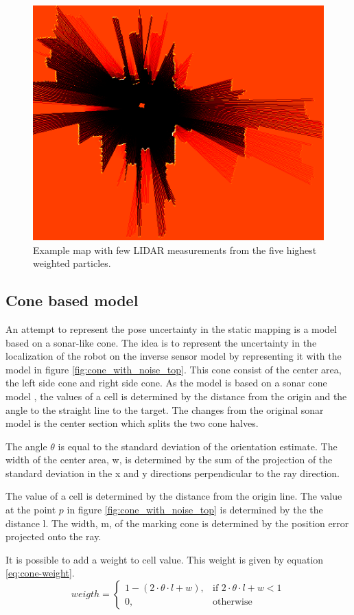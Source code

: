 \begin{figure}[htbp]
	\centering
	\includegraphics[width=0.7\linewidth]{figures/static_mapping/particle_sensor}
	\caption{Example map with few LIDAR measurements from the five highest weighted particles.}
	\label{fig:particle_sensor}
\end{figure}

\subsection{Cone based model}
An attempt to represent the pose uncertainty in the static mapping is a model based on a sonar-like cone. 
The idea is to represent the uncertainty in the localization of the robot on the inverse sensor model by representing it with the model in figure \vref{fig:cone_with_noise_top}.  
This cone consist of the center area, the left side cone and right side cone. 
As the model is based on a sonar cone model \cite{probRob}, the values of a cell is determined by the distance from the origin and the angle to the straight line to the target. The changes from the original sonar model is the center section which splits the two cone halves. 

The angle \(\theta\) is equal to the standard deviation of the orientation estimate. 
The width of the center area, w, is determined by the sum of the projection of the standard deviation in the x and y directions perpendicular to the ray direction. 

The value of a cell is determined by the distance from the origin line. 
The value at the point $p$ in figure \vref{fig:cone_with_noise_top} is determined by the the distance l.
The width, m, of the marking cone is determined by the position error projected onto the ray.

It is possible to add a weight to cell value. This weight is given by equation \vref{eq:cone-weight}.
\begin{equation}
\label{eq:cone-weight}
weigth = 
\begin{cases}
1 - ( 2 \cdot \theta \cdot l + w), & \text{if } 2 \cdot \theta \cdot l + w < 1\\
0, & \text{otherwise}
\end{cases}
\end{equation}

